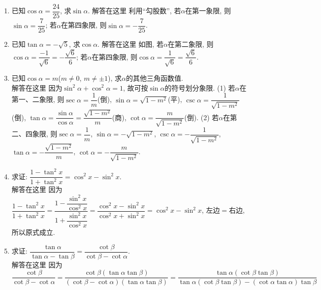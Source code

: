 \documentclass[10pt,a4paper]{article}
\begin{document}
\begin{enumerate}[1.]


\item 已知$\cos \alpha =\dfrac{24}{25}$, 求$\sin \alpha$.		
解答在这里  利用``勾股数'', 若$\alpha$在第一象限, 则$\sin \alpha =\dfrac 7{25}$; 若$\alpha$在第四象限, 则$\sin \alpha =-\dfrac 7{25}$.
\item 已知$\tan \alpha =-\sqrt 5$, 求$\cos \alpha$.
解答在这里 如图, 若$\alpha$在第二象限, 则$\cos \alpha =\dfrac{-1}{\sqrt 6}=-\dfrac{\sqrt 6}6$; 若$\alpha$在第四象限, 则$\cos \alpha =\dfrac 1{\sqrt 6}=\dfrac{\sqrt 6}6$.
\begin{center}
\end{center}
\item 已知$\cos \alpha =m$($m\ne 0$, $m\ne \pm 1$), 求$\alpha$的其他三角函数值.\\
解答在这里  因为$\sin ^2\alpha +\cos ^2\alpha =1$, 故可按$\sin \alpha$的符号划分象限.
(1) 若$\alpha$在第一、二象限, 则$\sec \alpha =\dfrac 1m$(倒), $\sin \alpha =\sqrt {1-m^2}$(平), $\csc \alpha =\dfrac 1{\sqrt {1-m^2}}$(倒), $\tan \alpha =\dfrac{\sin \alpha}{\cos \alpha}=\dfrac{\sqrt {1-m^2}}m$(商), $\cot \alpha =\dfrac m{\sqrt {1-m^2}}$(倒).
(2) 若$\alpha$在第二、四象限, 则$\sec \alpha =\dfrac 1m$, $\sin \alpha =-\sqrt {1-m^2}$, $\csc \alpha =-\dfrac 1{\sqrt {1-m^2}}$, $\tan \alpha =-\dfrac{\sqrt {1-m^2}}m$, $\cot \alpha =-\dfrac m{\sqrt {1-m^2}}$.
\item 求证: $\dfrac{1-\tan ^2x}{1+\tan ^2x}=\cos ^2x-\sin ^2x$.\\
解答在这里  因为$ \dfrac{1-\tan ^2x}{1+\tan ^2x}=\dfrac{1-\dfrac{\sin ^2x}{\cos ^2x}}{1+\dfrac{\sin ^2x}{\cos ^2x}}=\dfrac{\cos ^2x-\sin ^2x}{\cos ^2x+\sin ^2x}=\cos ^2x-\sin ^2x$, 左边$=$右边, 所以原式成立.
\item 求证: $\dfrac{\tan \alpha}{\tan \alpha -\tan \beta}=\dfrac{\cot \beta}{\cot \beta -\cot \alpha}$.\\
解答在这里 因为$\dfrac{\cot \beta}{\cot \beta -\cot \alpha}=\dfrac{\cot \beta (\tan \alpha \tan \beta)}{(\cot \beta -\cot \alpha)(\tan \alpha \tan \beta)}=\dfrac{\tan \alpha (\cot \beta \tan \beta)}{\tan \alpha (\cot \beta \tan \beta)-(\cot \alpha \tan \alpha)\tan \beta}$

\end{enumerate}
\end{document}
